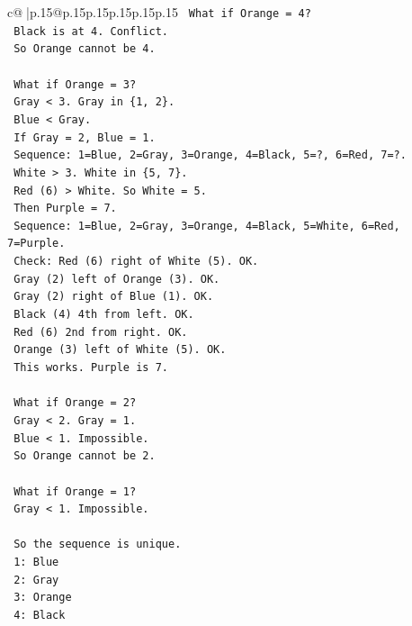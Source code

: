 \documentclass{article}
\begin{document}
{\begin{supertabular}{c@{$\;$}|p{.15\linewidth}@{}p{.15\linewidth}p{.15\linewidth}p{.15\linewidth}p{.15\linewidth}p{.15\linewidth}}
{{{\texttt{    What if Orange = 4?} \\
\texttt{    Black is at 4. Conflict.} \\
\texttt{    So Orange cannot be 4.} \\
\\ 
\texttt{    What if Orange = 3?} \\
\texttt{    Gray < 3. Gray in \{1, 2\}.} \\
\texttt{    Blue < Gray.} \\
\texttt{    If Gray = 2, Blue = 1.} \\
\texttt{    Sequence: 1=Blue, 2=Gray, 3=Orange, 4=Black, 5=?, 6=Red, 7=?.} \\
\texttt{    White > 3. White in \{5, 7\}.} \\
\texttt{    Red (6) > White. So White = 5.} \\
\texttt{    Then Purple = 7.} \\
\texttt{    Sequence: 1=Blue, 2=Gray, 3=Orange, 4=Black, 5=White, 6=Red, 7=Purple.} \\
\texttt{    Check: Red (6) right of White (5). OK.} \\
\texttt{    Gray (2) left of Orange (3). OK.} \\
\texttt{    Gray (2) right of Blue (1). OK.} \\
\texttt{    Black (4) 4th from left. OK.} \\
\texttt{    Red (6) 2nd from right. OK.} \\
\texttt{    Orange (3) left of White (5). OK.} \\
\texttt{    This works. Purple is 7.} \\
\\ 
\texttt{    What if Orange = 2?} \\
\texttt{    Gray < 2. Gray = 1.} \\
\texttt{    Blue < 1. Impossible.} \\
\texttt{    So Orange cannot be 2.} \\
\\ 
\texttt{    What if Orange = 1?} \\
\texttt{    Gray < 1. Impossible.} \\
\\ 
\texttt{    So the sequence is unique.} \\
\texttt{    1: Blue} \\
\texttt{    2: Gray} \\
\texttt{    3: Orange} \\
\texttt{    4: Black} \\
}}}
\end{supertabular}}
\end{document}
